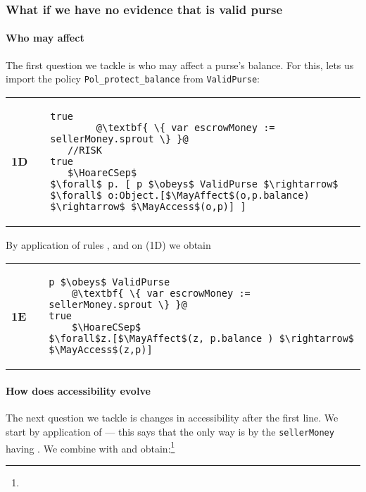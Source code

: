 \subsubsection{What if we have no evidence that  is valid purse}

\paragraph{Who may affect} The first question we tackle is who may affect a purse's balance.
For this,   lets us import the policy
\lstinline+Pol_protect_balance+ from \lstinline+ValidPurse+:  

\begin{tabular}{lll}
{\bf 1D} & & \begin{lstlisting}[escapechar=@]
true
        @\textbf{ \{ var escrowMoney := sellerMoney.sprout \} }@
   //RISK
true
   $\HoareCSep$
$\forall$ p. [ p $\obeys$ ValidPurse $\rightarrow$ $\forall$ o:Object.[$\MayAffect$(o,p.balance) $\rightarrow$ $\MayAccess$(o,p)] ]
\end{lstlisting}
\end{tabular}

By application of rules ,  and  on (1D) we obtain

\begin{tabular}{lll}
{\bf 1E} & & 
\begin{lstlisting}[escapechar=@]
p $\obeys$ ValidPurse 
    @\textbf{ \{ var escrowMoney := sellerMoney.sprout \} }@
true
    $\HoareCSep$
$\forall$z.[$\MayAffect$(z, p.balance ) $\rightarrow$ $\MayAccess$(z,p)]  
\end{lstlisting}
\end{tabular}




\vspace{.02in}
\paragraph{How does accessibility evolve} The next question we tackle is 
changes in accessibility after the first line.
We start by application of  ---
this says that the only way  is by the
\lstinline+sellerMoney+ having .
We combine  with  and obtain:\footnote{}
 

